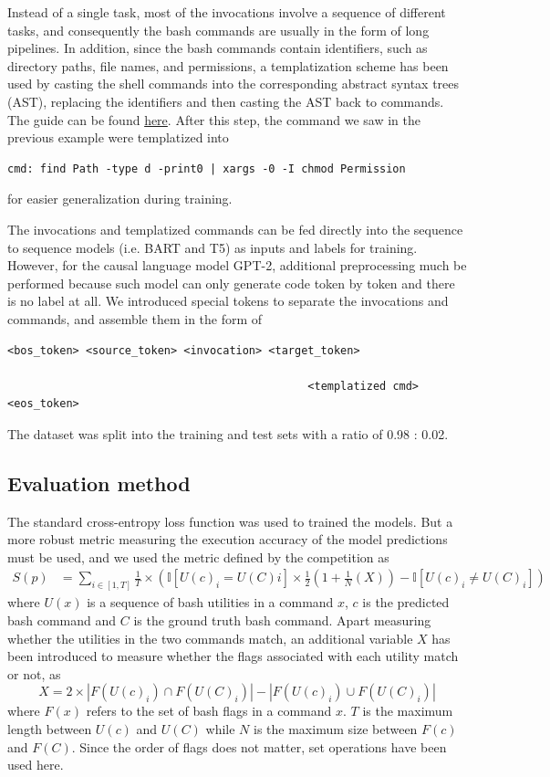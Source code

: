 \documentclass{article}
\begin{document}
Instead of a single task, most of the invocations involve a sequence of different tasks, and consequently the bash commands are usually in the form of long pipelines. In addition, since the bash commands contain identifiers, such as directory paths, file names, and permissions, a templatization scheme has been used by casting the shell commands into the corresponding abstract syntax trees (AST), replacing the identifiers and then casting the AST back to commands. The guide can be found \href{https://github.com/IBM/clai/tree/nlc2cmd}{here}. After this step, the command we saw in the previous example were templatized into
\begin{verbatim}
cmd: find Path -type d -print0 | xargs -0 -I chmod Permission
\end{verbatim}
for easier generalization during training.

The invocations and templatized commands can be fed directly into the sequence to sequence models (i.e. BART and T5) as inputs and labels for training. However, for the causal language model GPT-2, additional preprocessing much be performed because such model can only generate code token by token and there is no label at all. We introduced special tokens to separate the invocations and commands, and assemble them in the form of 

\begin{verbatim}
<bos_token> <source_token> <invocation> <target_token>

                                              <templatized cmd> <eos_token> 
\end{verbatim}

The dataset was split into the training and test sets with a ratio of 0.98 : 0.02.

\subsection{Evaluation method}
The standard cross-entropy loss function was used to trained the models. But a more robust metric measuring the execution accuracy of the model predictions must be used, and we used the metric defined by the competition as
\begin{align*}
	S(p) & =\sum_{i\in[1,T]}\frac{1}{T}\times\left(
	\mathbb{I}[U(c)_i=U(C)i]\times\frac{1}{2}\left(
		1+\frac{1}{N}\left(X\right)\right) -\mathbb{I}[U(c)_i\ne U(C)_i]
	\right)
\end{align*}
where $U(x)$ is a sequence of bash utilities in a command $x$, $c$ is the
predicted bash command and $C$ is the ground truth bash command. 
Apart measuring whether the utilities in the two commands match, an additional variable $X$ has been introduced to measure whether the flags associated with each utility match or not, as 
\begin{equation*}
X = 2\times
	|F(U(c)_i)\cap F(U(C)_i)| - |F(U(c)_i)\cup F(U(C)_i)|
\end{equation*}
where $F(x)$ refers to
the set of bash flags in a command $x$. $T$ is the maximum length between
$U(c)$ and $U(C)$ while $N$ is the maximum size between $F(c)$ and $F(C)$. Since the order of flags does not matter, set operations have been used here.
\end{document}

